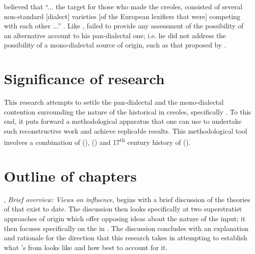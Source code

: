 \citet{Mufwene08, Mufwene01} believed that ``... the target for those who made the creoles, consisted of several non-standard [dialect] varieties [of the European lexifiers that were] competing with each other ...'' \citep[21]{Mufwene08}. Like \citet{Smith08, Smith87}, \citet{Mufwene08, Mufwene01} failed to provide any assessment of the possibility of an alternative account to his pan-dialectal one; i.e. he did not address the possibility of a mono-dialectal source of origin, such as that proposed by \citet{Smith08, Smith87}.

\section {Significance of research}\label{1.4}
This research attempts to settle the pan-dialectal and the mono-dialectal contention surrounding the nature of the historical  in  creoles, specifically . To this end, it puts forward a methodological apparatus that one can use to undertake such reconstructive work and achieve replicable results. This methodological tool involves a combination of  (),   () and 17\textsuperscript{th} century history of  ().

\section{Outline of chapters}\label{1.5}
, \emph{Brief overview: Views on  influence}, begins with a brief discussion of the theories of  that exist to date. The discussion then looks specifically at two superstratist approaches of origin which offer opposing ideas about the nature of the  input; it then focuses specifically on the  in . The discussion concludes with an explanation and rationale for the direction that this research takes in attempting to establish what 's  from  looks like and how best to account for it.

